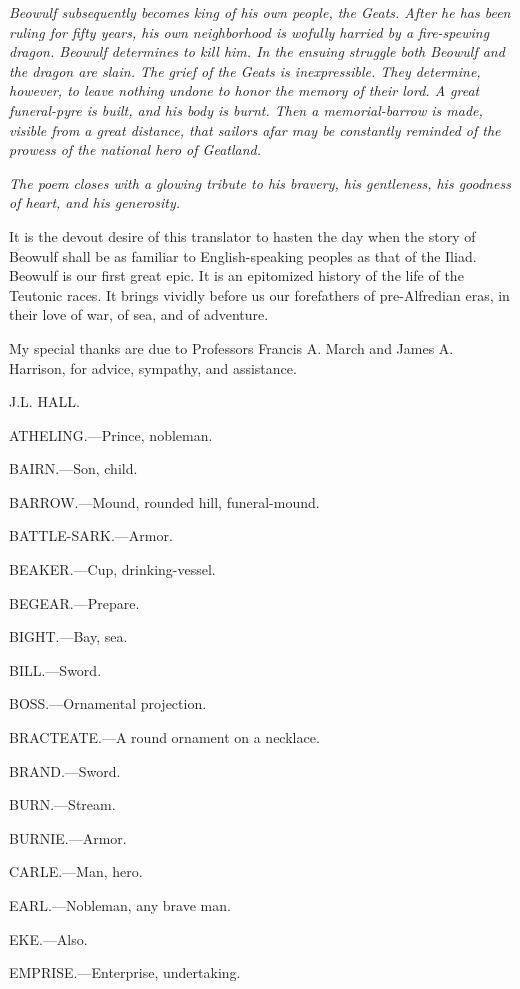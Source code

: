 \emph{Beowulf subsequently becomes king of his own people, the Geats. After he
has been ruling for fifty years, his own neighborhood is wofully harried by a
fire-spewing dragon. Beowulf determines to kill him. In the ensuing struggle
both Beowulf and the dragon are slain. The grief of the Geats is inexpressible.
They determine, however, to leave nothing undone to honor the memory
of their lord. A great funeral-pyre is built, and his body is burnt. Then a
memorial-barrow is made, visible from a great distance, that sailors afar may
be constantly reminded of the prowess of the national hero of Geatland.}

\emph{The poem closes with a glowing tribute to his bravery, his gentleness, his
goodness of heart, and his generosity.}

It is the devout desire of this translator to hasten the day when the story
of Beowulf shall be as familiar to English-speaking peoples as that of the Iliad.
Beowulf is our first great epic. It is an epitomized history of the life of the
Teutonic races. It brings vividly before us our forefathers of pre-Alfredian
eras, in their love of war, of sea, and of adventure.

My special thanks are due to Professors Francis A. March and James A.
Harrison, for advice, sympathy, and assistance.

J.L. HALL.


ATHELING.—Prince, nobleman.

BAIRN.—Son, child.

BARROW.—Mound, rounded hill, funeral-mound.

BATTLE-SARK.—Armor.

BEAKER.—Cup, drinking-vessel.

BEGEAR.—Prepare.

BIGHT.—Bay, sea.

BILL.—Sword.

BOSS.—Ornamental projection.

BRACTEATE.—A round ornament on a necklace.

BRAND.—Sword.

BURN.—Stream.

BURNIE.—Armor.

CARLE.—Man, hero.

EARL.—Nobleman, any brave man.

EKE.—Also.

EMPRISE.—Enterprise, undertaking.

